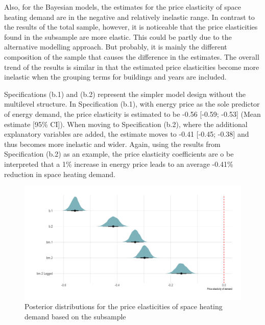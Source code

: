 \documentclass[12pt,twoside]{reedthesis}
\begin{document}
Also, for the Bayesian models, the estimates for the price elasticity of space heating demand are in the negative and relatively inelastic range. In contrast to the results of the total sample, however, it is noticeable that the price elasticities found in the subsample are more elastic. This could be partly due to the alternative modelling approach. But probably, it is mainly the different composition of the sample that causes the difference in the estimates. The overall trend of the results is similar in that the estimated price elasticities become more inelastic when the grouping terms for buildings and years are included.

Specifications (b.1) and (b.2) represent the simpler model design without the multilevel structure. In Specification (b.1), with energy price as the sole predictor of energy demand, the price elasticity is estimated to be -0.56 {[}-0.59; -0.53{]} (Mean estimate {[}95\% CI{]}). When moving to Specification (b.2), where the additional explanatory variables are added, the estimate moves to -0.41 {[}-0.45; -0.38{]} and thus becomes more inelastic and wider. Again, using the results from Specification (b.2) as an example, the price elasticity coefficients are o be interpreted that a 1\% increase in energy price leads to an average -0.41\% reduction in space heating demand.
\begin{figure}

{\centering \includegraphics[width=1\linewidth]{figure/posterior-distributions} 

}

\caption{Posterior distributions for the price elasticities of space heating demand based on the subsample}\label{fig:posterior-distributions}
\end{figure}
\end{document}
